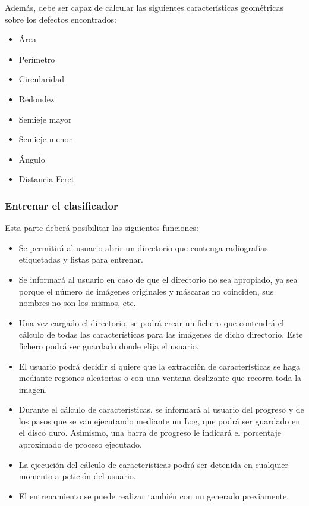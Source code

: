 Además, debe ser capaz de calcular las siguientes características geométricas sobre los defectos encontrados:
\begin{itemize}
\item Área
\item Perímetro
\item Circularidad
\item Redondez
\item Semieje mayor
\item Semieje menor
\item Ángulo
\item Distancia Feret
\end{itemize}


\subsubsection{Entrenar el clasificador}
Esta parte deberá posibilitar las siguientes funciones:
\begin{itemize}
 \item Se permitirá al usuario abrir un directorio que contenga radiografías etiquetadas y listas para entrenar.
  \item Se informará al usuario en caso de que el directorio no sea apropiado, ya sea porque el número de imágenes originales y máscaras no coinciden, sus nombres no son los mismos, etc.
 \item Una vez cargado el directorio, se podrá crear un fichero \arff{} que contendrá el cálculo de todas las características para las imágenes de dicho directorio. Este fichero podrá ser guardado donde elija el usuario.
 \item El usuario podrá decidir si quiere que la extracción de características se haga mediante regiones aleatorias o con una ventana deslizante que recorra toda la imagen.
 \item Durante el cálculo de características, se informará al usuario del progreso y de los pasos que se van ejecutando mediante un Log, que podrá ser guardado en el disco duro. Asimismo, una barra de progreso le indicará el porcentaje aproximado de proceso ejecutado.
 \item La ejecución del cálculo de características podrá ser detenida en cualquier momento a petición del usuario.
 \item El entrenamiento se puede realizar también con un \arff{} generado previamente.
\end{itemize}


